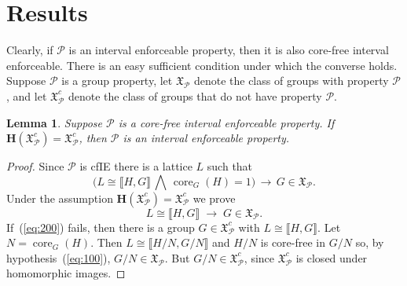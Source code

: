 \documentclass{gen-j-l}
\newcommand{\lb}{\ensuremath{\llbracket}}
\newcommand{\rb}{\ensuremath{\rrbracket}}
\newcommand{\<}{\ensuremath{\langle}}
\renewcommand{\>}{\ensuremath{\rangle}}
\theoremstyle{plain}
\newtheorem{lemma}[theorem]{Lemma}
\theoremstyle{definition}
\theoremstyle{remark}
\numberwithin{theorem}{section}
\numberwithin{claim}{section}
\numberwithin{equation}{section}
\numberwithin{conjecture}{section}
\newcommand{\Meet}{\ensuremath{\bigwedge}}
\newcommand{\core}{\ensuremath{\operatorname{core}}}
\newcommand{\2}{\ensuremath{\mathbf{2}}}
\newcommand{\3}{\ensuremath{\mathbf{3}}}
\newcommand{\sG}{\ensuremath{\mathfrak{X}}}
\newcommand{\bH}{\ensuremath{\mathbf{H}}}
\newcommand{\cP}{\ensuremath{\mathcal{P}}}
\begin{document}
\section{Results}
Clearly, if $\cP$ is an interval enforceable property, then it is also
core-free interval enforceable.  There is an easy
sufficient condition under which the converse holds.  
Suppose $\cP$ is a group property, let $\sG_{\cP}$  denote the
class of groups with property $\cP$, and let
 $\sG_{\cP}^c$ denote the class of groups that do not have property $\cP$.
\begin{lemma}
\label{lemma-wjd-2}
Suppose $\cP$ is a core-free interval enforceable property.  
If $\bH(\sG_{\cP}^c) = \sG_{\cP}^c$, then $\cP$ is an interval enforceable property.
\end{lemma}
\begin{proof}
Since $\cP$ is \acs{cfIE} there is a lattice $L$ such that
\begin{equation}
  \label{eq:100}
\bigl(L \cong \lb H,G \rb \, \Meet \, \core_G(H)=1\bigr) \, \longrightarrow \, G\in \sG_\cP.
\end{equation}
Under the assumption $\bH(\sG_\cP^c) = \sG_\cP^c$ we prove
\begin{equation}
  \label{eq:200}
L \cong \lb H,G \rb \; \longrightarrow \; G\in \sG_\cP.
\end{equation}
If~(\ref{eq:200}) fails, then there is a
group $G\in \sG_{\cP}^c$ with $L\cong \lb H,G \rb$.  Let $N = \core_G(H)$.  Then $L \cong
\lb H/N,G/N \rb$ and $H/N$ is core-free in $G/N$ so, by hypothesis~(\ref{eq:100}),
$G/N \in \sG_\cP$.  But $G/N \in \sG_{\cP}^c$, since $\sG_{\cP}^c$ is closed under homomorphic images.
\end{proof}
\end{document}
